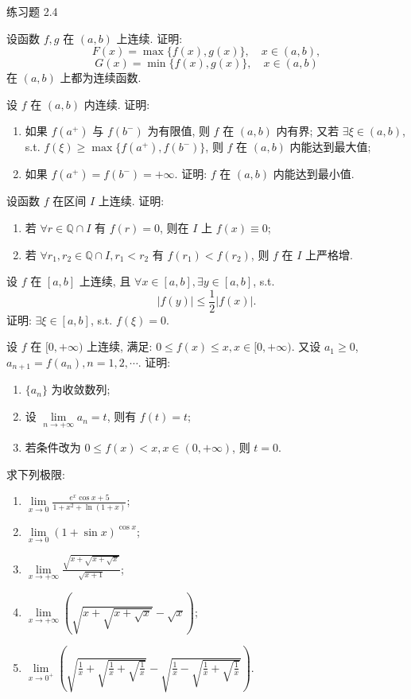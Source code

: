 \begin{exblock}{练习题 2.4}
\item 设函数 $f, g$ 在 $(a, b)$ 上连续. 证明:
  \[
  F(x) = \max\{f(x), g(x)\},\quad x \in (a, b),
\]
  \[
  G(x) = \min\{f(x), g(x)\},\quad x \in (a, b)
\]
  在 $(a, b)$ 上都为连续函数.

\item 设 $f$ 在 $(a, b)$ 内连续. 证明:
  \begin{enumerate}[label=(\arabic*)]
    \item 如果 $f(a^+)$ 与 $f(b^-)$ 为有限值, 则 $f$ 在 $(a, b)$ 内有界; 又若 $\exists \xi \in (a, b)$, s.t. $f(\xi) \geqslant \max\{f(a^+), f(b^-)\}$, 则 $f$ 在 $(a, b)$ 内能达到最大值;
    \item 如果 $f(a^+) = f(b^-) = +\infty$. 证明: $f$ 在 $(a, b)$ 内能达到最小值.
  \end{enumerate}

\item 设函数 $f$ 在区间 $I$ 上连续. 证明:
  \begin{enumerate}[label=(\arabic*)]
    \item 若 $\forall r \in \mathbb{Q} \cap I$ 有 $f(r) = 0$, 则在 $I$ 上 $f(x) \equiv 0$;
    \item 若 $\forall r_1, r_2 \in \mathbb{Q} \cap I, r_1 < r_2$ 有 $f(r_1) < f(r_2)$, 则 $f$ 在 $I$ 上严格增.
  \end{enumerate}

\item 设 $f$ 在 $[a, b]$ 上连续, 且 $\forall x \in [a, b], \exists y \in [a, b]$, s.t.
  \[
  |f(y)| \leqslant \frac{1}{2}|f(x)|.
\]
  证明: $\exists \xi \in [a, b]$, s.t. $f(\xi) = 0$.

\item 设 $f$ 在 $[0, +\infty)$ 上连续, 满足: $0 \leqslant f(x) \leqslant x, x \in [0, +\infty)$. 又设 $a_1 \geqslant 0$, $a_{n+1} = f(a_n), n = 1, 2, \cdots$. 证明:
  \begin{enumerate}[label=(\arabic*)]
    \item $\{a_n\}$ 为收敛数列;
    \item 设 $\lim\limits_{n \to +\infty} a_n = t$, 则有 $f(t) = t$;
    \item 若条件改为 $0 \leqslant f(x) < x, x \in (0, +\infty)$, 则 $t = 0$.
  \end{enumerate}

\item 求下列极限:
  \begin{enumerate}[label=(\arabic*)]
    \item $\lim\limits_{x \to 0} \frac{e^x\cos x + 5}{1 + x^2 + \ln(1 + x)}$;
    \item $\lim\limits_{x \to 0} (1 + \sin x)^{\cos x}$;
    \item $\lim\limits_{x \to +\infty} \frac{\sqrt{x + \sqrt{x + \sqrt{x}}}}{\sqrt{x + 1}}$;
    \item $\lim\limits_{x \to +\infty} \left(\sqrt{x + \sqrt{x + \sqrt{x}}} - \sqrt{x}\right)$;
    \item $\lim\limits_{x \to 0^+} \left(\sqrt{\frac{1}{x} + \sqrt{\frac{1}{x} + \sqrt{\frac{1}{x}}}} - \sqrt{\frac{1}{x} - \sqrt{\frac{1}{x} + \sqrt{\frac{1}{x}}}}\right)$.
  \end{enumerate}


\end{exblock}
